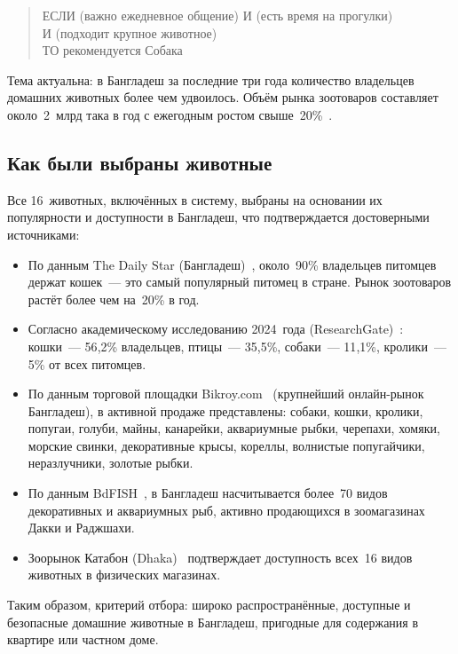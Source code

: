 \documentclass[a4paper,final]{article}
\begin{document}
\begin{quote}
ЕСЛИ (важно ежедневное общение) И (есть время на прогулки)\\
И (подходит крупное животное)\\
ТО рекомендуется Собака
\end{quote}

Тема актуальна: в Бангладеш за последние три года количество владельцев домашних животных более чем удвоилось. Объём рынка зоотоваров составляет около~2~млрд така в год с ежегодным ростом свыше~20\%~\cite{dailystar}.

\subsection*{Как были выбраны животные}

Все 16~животных, включённых в систему, выбраны на основании их популярности и доступности в Бангладеш, что подтверждается достоверными источниками:

\begin{itemize}
	\item По данным The Daily Star (Бангладеш)~\cite{dailystar}, около~90\% владельцев питомцев держат кошек~--- это самый популярный питомец в стране. Рынок зоотоваров растёт более чем на~20\% в год.

	\item Согласно академическому исследованию 2024~года (ResearchGate)~\cite{researchgate1}: кошки~--- 56{,}2\% владельцев, птицы~--- 35{,}5\%, собаки~--- 11{,}1\%, кролики~--- 5\% от всех питомцев.

	\item По данным торговой площадки Bikroy.com~\cite{bikroy} (крупнейший онлайн-рынок Бангладеш), в активной продаже представлены: собаки, кошки, кролики, попугаи, голуби, майны, канарейки, аквариумные рыбки, черепахи, хомяки, морские свинки, декоративные крысы, кореллы, волнистые попугайчики, неразлучники, золотые рыбки.

	\item По данным BdFISH~\cite{bdfish}, в Бангладеш насчитывается более~70 видов декоративных и аквариумных рыб, активно продающихся в зоомагазинах Дакки и Раджшахи.

	\item Зоорынок Катабон (Dhaka)~\cite{katabon} подтверждает доступность всех~16 видов животных в физических магазинах.
\end{itemize}

Таким образом, критерий отбора: широко распространённые, доступные и безопасные домашние животные в Бангладеш, пригодные для содержания в квартире или частном доме.
\end{document}
